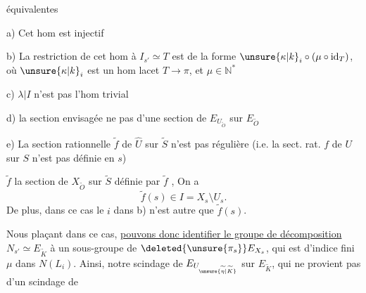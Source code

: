équivalentes

a) Cet hom est injectif

b) La restriction de cet hom à $I_{s'}\simeq T$ est
de la forme $\unsure{\kappa|k}_i\circ(\mu\circ\operatorname{id}_T)$, où $\unsure{\kappa|k}_i$ est un
hom lacet $T\longrightarrow\pi$, et $\mu\in\mathbb N^{*}$

c) $\lambda\vert I$ n'est pas l'hom trivial

d) la section envisagée  ne  pas
d'une section de $E_{U_{\widetilde O}}$ sur $E_{\widetilde O}$

e) La section rationnelle  $\widetilde f$ de $\widehat U$ sur
$\widetilde S$ n'est pas régulière (i.e. la sect. rat.
$f$ de $U$ sur $S$ n'est pas définie en $s$)

  $\widetilde f$  la section de $X_{\widetilde O}$ sur $\widetilde S$
définie par $\widetilde f$ ,
 On a
\[
\widetilde f(s)\in I=X_s\setminus U_s.
\]
De plus, dans ce cas le $i$ dans b) n'est
autre que $\widetilde f(s)$.

Nous plaçant dans ce cas, \uline{ pouvons donc
identifier le groupe de décomposition} $N_{s'}\simeq E_{\widetilde K}$
à un sous-groupe de $\deleted{\unsure{\pi_s}}E_{X_s}$,  qui est
d'indice fini $\mu$ dans  $N(L_i)$. Ainsi,
notre scindage  de $E_{U_{\unsure{\widetilde\eta|\widetilde K}}}$  sur $E_{\widetilde K}$,
qui ne provient pas d'un scindage de
